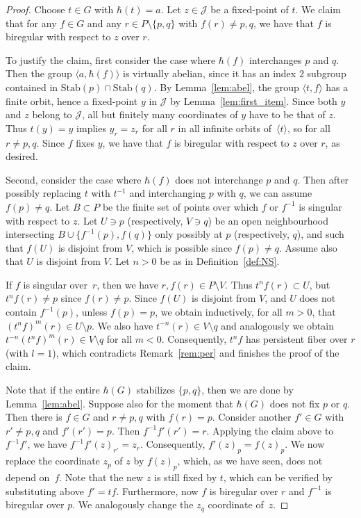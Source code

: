 \documentclass[11pt]{article}
\numberwithin{equation}{section}
\newcommand{\Jon}{\mathscr{J}}
\theoremstyle{plain}
\theoremstyle{definition}
\begin{document}
\begin{proof}
Choose $t\in G$ with $\hbar(t)=a$. Let $z\in \Jon$ be a fixed-point of $t$. We claim that for any $f\in G$ and any $r\in P\setminus \{p,q\}$ with $f(r)\neq p,q$, we have that $f$ is biregular with respect to $z$ over $r$.

To justify the claim, first consider the case where $\hbar(f)$ interchanges $p$ and $q$. Then the group $\langle a, \hbar(f)\rangle$ is virtually abelian, {since it has an index $2$ subgroup contained in $\mathrm{Stab}(p)\cap\mathrm{Stab}(q)$}. By Lemma~\ref{lem:abel}, the group $\langle t,f\rangle$ has a finite orbit, hence a fixed-point $y$ in $\Jon$ by Lemma~\ref{lem:first_item}. {Since both $y$ and $z$ belong to $\Jon$}, all but finitely many coordinates of $y$ have to be that of $z$. {Thus} $t(y)=y$ implies $y_r=z_r$ for all $r$ in all infinite orbits of~$\langle t\rangle$, so for all $r\neq p,q$. Since $f$ fixes $y$, we have that $f$ is biregular with respect to $z$ over $r$, as desired.

Second, consider the case where $\hbar(f)$ does not interchange $p$ and $q$. Then after possibly replacing $t$ with $t^{-1}$ and interchanging $p$ with $q$, we can assume $f(p)\neq q$. Let $B\subset P$ be the finite set of points over which $f$ or $f^{-1}$ is singular with respect to $z$. Let $U\ni p$ (respectively, $V\ni q$) be an open neighbourhood intersecting $B\cup \{f^{-1}(p),f(q)\}$ only possibly at $p$ (respectively, $q$), and such that $f(U)$ is disjoint from $V$, which is possible since $f(p)\neq q$.
{Assume also that $U$ is disjoint from $V$.}
Let $n>0$ be as in Definition~\ref{def:NS}.

If $f$ is singular over~$r$, then we have $r,f(r)\in P\setminus V$. Thus $t^nf(r)\subset U$, but $t^nf(r)\neq p$ since $f(r)\neq p$.
Since $f(U)$ is disjoint from $V$, and $U$ does not contain $f^{-1}(p)$, unless $f(p)=p$, we obtain inductively, for all $m>0$, that $(t^nf)^m(r)\in U\setminus p$. We also have $t^{-n}(r)\in V\setminus q$ and analogously we obtain $t^{-n}(t^nf)^m(r)\in V\setminus q$ for all $m<0$. Consequently, $t^nf$ has persistent fiber over $r$ (with $l=1$), which contradicts Remark~\ref{rem:per} and finishes the proof of the claim.

Note that if the entire $\hbar(G)$ stabilizes $\{p,q\}$, then we are done by Lemma~\ref{lem:abel}. Suppose also for the moment that $\hbar(G)$ does not {fix} $p$ or $q$. Then there is $f\in G$ and $r\neq p,q$ with $f(r)=p$. Consider another $f'\in G$ with $r'\neq p,q$ and $f'(r')=p$. Then $f^{-1}f'(r')=r$. Applying the claim above to $f^{-1}f'$, we have $f^{-1}f'(z)_{r'}= z_{r}$. Consequently, $f'(z)_{p}= f(z)_{p}$. We now replace the coordinate $z_p$ of $z$ by $f(z)_{p}$, which, as we have seen, does not depend on~$f$. Note that the new $z$ is still fixed by $t$, which can be verified by substituting above $f'=tf$. Furthermore, now $f$ is biregular over $r$ and $f^{-1}$ is biregular over $p$.
We analogously change the $z_q$ coordinate of~$z$.


\end{proof}
\end{document}
